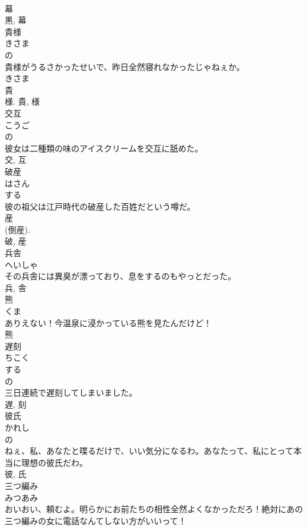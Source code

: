 \documentclass[8pt]{extreport}
\begin{document}
\begin{CJK}{UTF8}{min}
\\	幕 
\\	黒, 幕	
\\	貴様	
\\	きさま	
\\	の 
\\	貴様がうるさかったせいで、昨日全然寝れなかったじゃねぇか。	
\\	きさま 
\\	貴 
\\	様.	貴, 様	
\\	交互	
\\	こうご	
\\	の 
\\	彼女は二種類の味のアイスクリームを交互に舐めた。	
\\	交, 互	
\\	破産	
\\	はさん	
\\	する 
\\	彼の祖父は江戸時代の破産した百姓だという噂だ。	
\\	産 
\\	(倒産). 
\\	破, 産	
\\	兵舎	
\\	へいしゃ	
\\	その兵舎には異臭が漂っており、息をするのもやっとだった。	
\\	兵, 舎	
\\	熊	
\\	くま	
\\	ありえない！今温泉に浸かっている熊を見たんだけど！	
\\	熊	
\\	遅刻	
\\	ちこく	
\\	する 
\\	の 
\\	三日連続で遅刻してしまいました。	
\\	遅, 刻	
\\	彼氏	
\\	かれし	
\\	の 
\\	ねぇ、私、あなたと喋るだけで、いい気分になるわ。あなたって、私にとって本当に理想の彼氏だわ。	
\\	彼, 氏	
\\	三つ編み	
\\	みつあみ	
\\	おいおい、頼むよ。明らかにお前たちの相性全然よくなかっただろ！絶対にあの三つ編みの女に電話なんてしない方がいいって！	

\end{CJK}
\end{document}
